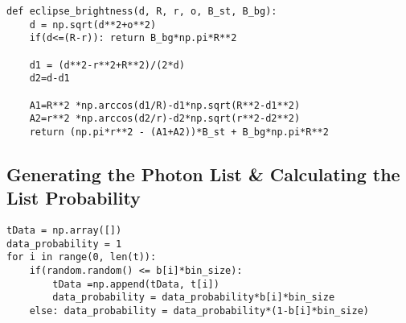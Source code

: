 \documentclass[aps,letterpaper,10pt]{revtex4}
\begin{document}
\begin{verbatim}
def eclipse_brightness(d, R, r, o, B_st, B_bg):
	d = np.sqrt(d**2+o**2)
	if(d<=(R-r)): return B_bg*np.pi*R**2
	
	d1 = (d**2-r**2+R**2)/(2*d)
	d2=d-d1
	
	A1=R**2 *np.arccos(d1/R)-d1*np.sqrt(R**2-d1**2)
	A2=r**2 *np.arccos(d2/r)-d2*np.sqrt(r**2-d2**2)
	return (np.pi*r**2 - (A1+A2))*B_st + B_bg*np.pi*R**2
\end{verbatim}

\vspace{3mm}

\subsection{Generating the Photon List \& Calculating the List Probability}

\begin{verbatim}
tData = np.array([])
data_probability = 1
for i in range(0, len(t)):
	if(random.random() <= b[i]*bin_size): 
		tData =np.append(tData, t[i])
		data_probability = data_probability*b[i]*bin_size
	else: data_probability = data_probability*(1-b[i]*bin_size)
\end{verbatim}
\end{document}
